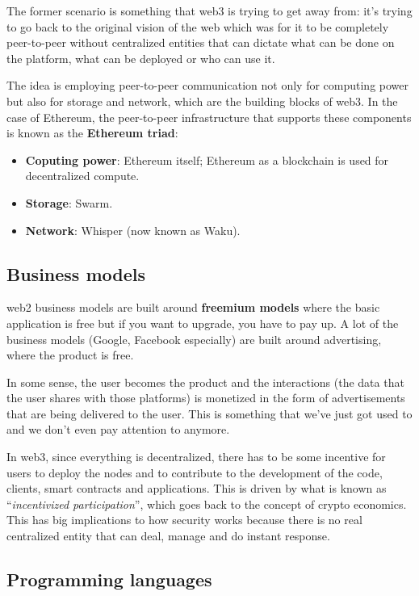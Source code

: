The former scenario is something that web3 is trying to get away from:
it's trying to go back to the original vision of the web which was for
it to be completely peer-to-peer without centralized entities that can
dictate what can be done on the platform, what can be deployed or who
can use it.

The idea is employing peer-to-peer communication not only for computing
power but also for storage and network, which are the building blocks of
web3. In the case of Ethereum, the peer-to-peer infrastructure that
supports these components is known as the \textbf{Ethereum triad}:

\begin{itemize}
\tightlist
\item
  \textbf{Coputing power}: Ethereum itself; Ethereum as a blockchain is
  used for decentralized compute.
\item
  \textbf{Storage}: Swarm.
\item
  \textbf{Network}: Whisper (now known as Waku).
\end{itemize}

\subsection{Business models}\label{business-models}

web2 business models are built around \textbf{freemium models} where the
basic application is free but if you want to upgrade, you have to pay
up. A lot of the business models (Google, Facebook especially) are built
around advertising, where the product is free.

In some sense, the user becomes the product and the interactions (the
data that the user shares with those platforms) is monetized in the form
of advertisements that are being delivered to the user. This is
something that we've just got used to and we don't even pay attention to
anymore.

In web3, since everything is decentralized, there has to be some
incentive for users to deploy the nodes and to contribute to the
development of the code, clients, smart contracts and applications. This
is driven by what is known as ``\emph{incentivized participation}'',
which goes back to the concept of crypto economics. This has big
implications to how security works because there is no real centralized
entity that can deal, manage and do instant response.

\subsection{Programming languages}\label{programming-languages}

